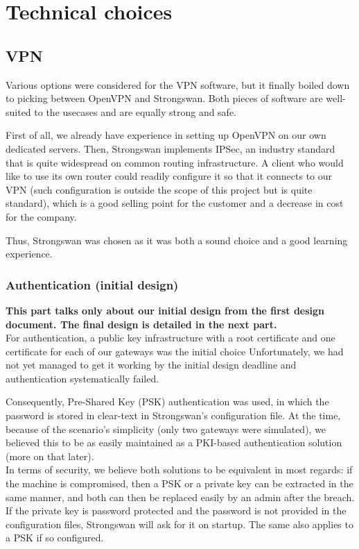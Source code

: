 \documentclass[paper=a4, fontsize=11pt]{scrartcl}
\begin{document}
\section{Technical choices}

\subsection{VPN}

Various options were considered for the VPN software, but it finally boiled down
to picking between OpenVPN and Strongswan.
Both pieces of software are well-suited to the usecases and are equally
strong and safe.

First of all, we already have experience in setting up OpenVPN on our own
dedicated servers.
Then, Strongswan implements IPSec, an industry standard that is quite widespread
on common routing infrastructure.
A client who would like to use its own router could readily configure
it so that it connects to our VPN (such configuration is outside the
scope of this project but is quite standard), which is a good selling point for
the customer and a decrease in cost for the company.

Thus, Strongswan was chosen as it was both a sound choice and a good learning
experience.

\subsubsection{Authentication (initial design)}
\textbf{%
\huge \danger{} \normalsize
This part talks only about our initial design from the first design document.
The final design is detailed in the next part.
}
\\

For authentication, a public key infrastructure with a root certificate and one
certificate for each of our gateways was the initial choice
Unfortunately, we had not yet managed to get it working by the initial design
deadline and authentication systematically failed.

Consequently, Pre-Shared Key (PSK) authentication was used, in which the
password is stored in clear-text in Strongswan's configuration file.
At the time, because of the scenario's simplicity (only two gateways were
simulated), we believed this to be as easily maintained as a
PKI-based authentication solution (more on that later).\\

In terms of security, we believe both solutions to be equivalent in most
regards: if the machine is compromised, then a PSK or a private key can be
extracted in the same manner, and both can then be replaced easily by an admin
after the breach. 
If the private key is password protected and the password is not provided in the
configuration files, Strongswan will ask for it on startup.
The same also applies to a PSK if so configured.
\end{document}
